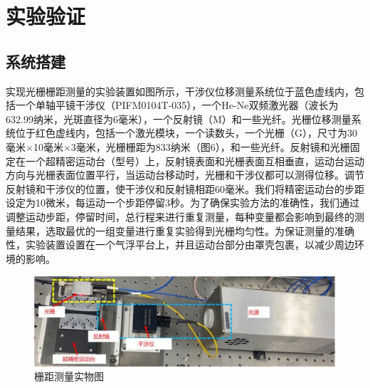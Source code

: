 \documentclass[type=master,oneside]{fduthesis}
\begin{document}
\section{实验验证}
\subsection{系统搭建}
实现光栅栅距测量的实验装置如图所示，干涉仪位移测量系统位于蓝色虚线内，包括一个单轴平镜干涉仪（PIFM0104T-035），一个He-Ne双频激光器（波长为632.99纳米，光斑直径为6毫米），一个反射镜（M）和一些光纤。光栅位移测量系统位于红色虚线内，包括一个激光模块，一个读数头，一个光栅（G），尺寸为30毫米×10毫米×3毫米，光栅栅距为833纳米（图6），和一些光纤。反射镜和光栅固定在一个超精密运动台（型号）上，反射镜表面和光栅表面互相垂直，运动台运动方向与光栅表面位置平行，当运动台移动时，光栅和干涉仪都可以测得位移。调节反射镜和干涉仪的位置，使干涉仪和反射镜相距60毫米。我们将精密运动台的步距设定为10微米，每运动一个步距停留3秒。为了确保实验方法的准确性，我们通过调整运动步距，停留时间，总行程来进行重复测量，每种变量都会影响到最终的测量结果，选取最优的一组变量进行重复实验得到光栅均匀性。为保证测量的准确性，实验装置设置在一个气浮平台上，并且运动台部分由罩壳包裹，以减少周边环境的影响。
\begin{figure}[H]
  \centering
  \includegraphics[width=1\textwidth]{5-fig/栅距测量实物图.jpg}
  \caption{栅距测量实物图}
  \label{fig:栅距测量实物图}
\end{figure}
\end{document}
